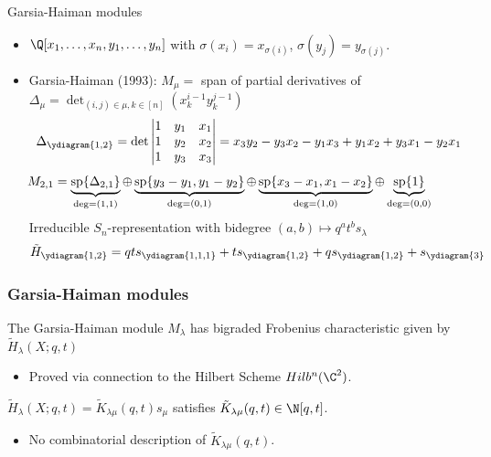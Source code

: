 \documentclass[dvipsnames]{beamer}
\renewcommand{\Span}{\operatorname{sp}}
\theoremstyle{definition}
\begin{document}
\begin{frame}{Garsia-Haiman modules}
  \begin{itemize}
  \item \(\Q[x_1,\ldots,x_n,y_1,\ldots,y_n]\) with 
    \(\sigma(x_i) = x_{\sigma(i)}\), \(\sigma(y_j) = y_{\sigma(j)}\).\pause
  \item Garsia-Haiman (1993): \(M_\mu = \) span of partial derivatives of
    \(\Delta_\mu = \det_{(i,j) \in \mu, k \in [n]} (x_k^{i-1} y_k^{j-1})\) \pause \[
      \Delta_{\ydiagram{1,2}} = \det \left|
        \begin{matrix}
          1 & y_1 & x_1 \\
          1 & y_2 & x_2 \\
          1 & y_3 & x_3
        \end{matrix}
      \right| = x_3 y_2 - y_3 x_2 - y_1 x_3 + y_1 x_2 + y_3 x_1 - y_2 x_1
    \]
    \pause
  \[
    \hspace{-3em}
      M_{2,1} = \underbrace{\Span\{\Delta_{2,1}\}}_{\deg = (1,1)}
      \oplus \underbrace{\Span\{y_3-y_1, y_1 - y_2\}}_{\deg = (0,1)}
      \oplus \underbrace{\Span\{x_3-x_1, x_1 - x_2\}}_{\deg = (1,0)}
      \oplus \underbrace{\Span \{1\}}_{\deg = (0,0)}
    \]
    \pause
    Irreducible \(S_n\)-representation with bidegree \((a,b) \mapsto
    q^at^b s_\lambda\) \pause \[
      \tilde{H}_{\ydiagram{1,2}} = qt s_{\ydiagram{1,1,1}} + t
      s_{\ydiagram{1,2}} + q s_{\ydiagram{1,2}} + s_{\ydiagram{3}}
    \]
  \end{itemize}
\end{frame}
\begin{frame}
  \frametitle{Garsia-Haiman modules}
  \begin{theorem}[Haiman, 2001]
    The Garsia-Haiman module \(M_\lambda\) has bigraded Frobenius
    characteristic given by \(\tilde{H}_\lambda(X;q,t)\)
  \end{theorem}\pause
  \begin{itemize}
  \item Proved via connection to the Hilbert Scheme \(Hilb^n(\C^2)\).\pause
  \end{itemize}
  \begin{corollary}
    \(\tilde{H}_\lambda(X;q,t) = \tilde{K}_{\lambda \mu}(q,t) s_\mu\)
    satisfies \(\tilde{K}_{\lambda \mu}(q,t) \in \N[q,t]\).
  \end{corollary}\pause
  \begin{itemize}
  \item No combinatorial description of \(\tilde{K}_{\lambda \mu}(q,t)\).
  \end{itemize}
  \end{frame}
\end{document}
